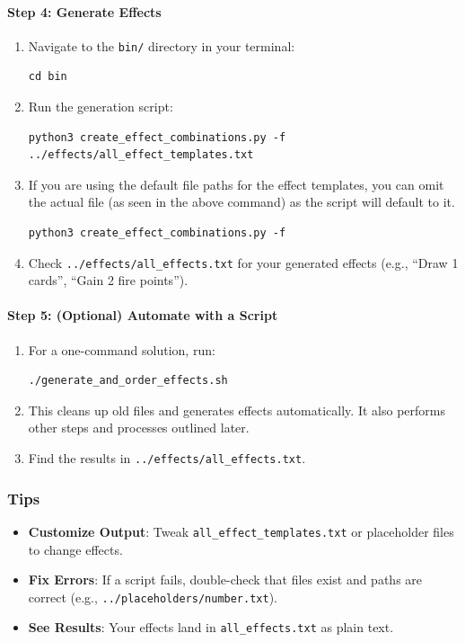 \paragraph{Step 4: Generate Effects}
\begin{enumerate}
	\item Navigate to the \texttt{bin/} directory in your terminal:
\begin{lstlisting}[style=terminalstyle]
cd bin
\end{lstlisting}
	\item Run the generation script:
\begin{lstlisting}[style=terminalstyle]
python3 create_effect_combinations.py -f ../effects/all_effect_templates.txt
\end{lstlisting}
	\item If you are using the default file paths for the effect templates, you can omit the actual file (as seen in the above command) as the script will default to it.
\begin{lstlisting}[style=terminalstyle]
python3 create_effect_combinations.py -f
\end{lstlisting}
	\item Check \texttt{../effects/all\_effects.txt} for your generated effects (e.g., ``Draw 1 cards'', ``Gain 2 fire points'').
\end{enumerate}

\paragraph{Step 5: (Optional) Automate with a Script}
\begin{enumerate}
	\item For a one-command solution, run:
\begin{lstlisting}[style=terminalstyle]
./generate_and_order_effects.sh
\end{lstlisting}
	\item This cleans up old files and generates effects automatically. It also performs other steps and processes outlined later.
	\item Find the results in \texttt{../effects/all\_effects.txt}.
\end{enumerate}

\subsubsection{Tips}
\begin{itemize}
	\item \textbf{Customize Output}: Tweak \texttt{all\_effect\_templates.txt} or placeholder files to change effects.
	\item \textbf{Fix Errors}: If a script fails, double-check that files exist and paths are correct (e.g., \texttt{../placeholders/number.txt}).
	\item \textbf{See Results}: Your effects land in \texttt{all\_effects.txt} as plain text.
\end{itemize}







